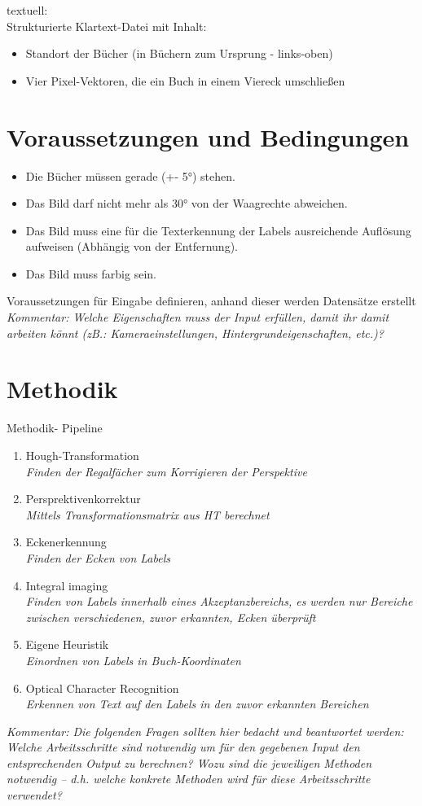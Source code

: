 \documentclass[deutsch]{scrartcl}
\begin{document}
\noindent textuell:\\
Strukturierte Klartext-Datei mit Inhalt:
\begin{itemize}
  \item Standort der Bücher (in Büchern zum Ursprung - links-oben)
  \item Vier Pixel-Vektoren, die ein Buch in einem Viereck umschließen
\end{itemize}

\section{Voraussetzungen und Bedingungen}

\begin{itemize}
  \item Die Bücher müssen gerade (+- 5°) stehen.
  \item Das Bild darf nicht mehr als 30° von der Waagrechte abweichen.
  \item Das Bild muss eine für die Texterkennung der Labels ausreichende Auflösung aufweisen (Abhängig von der Entfernung).
  \item Das Bild muss farbig sein.
\end{itemize}

Voraussetzungen für Eingabe definieren, anhand dieser werden Datensätze erstellt\\
\textit{Kommentar: Welche Eigenschaften muss der Input erfüllen, damit ihr damit arbeiten könnt (zB.: Kameraeinstellungen, Hintergrundeigenschaften, etc.)?}
\section{Methodik}
Methodik- Pipeline
\begin{enumerate}
	\item Hough-Transformation\\
		\textit{Finden der Regalfächer zum Korrigieren der Perspektive}
	\item Persprektivenkorrektur\\
		\textit{Mittels Transformationsmatrix aus HT berechnet}
	\item Eckenerkennung\\
		\textit{Finden der Ecken von Labels}
	\item Integral imaging\\
		\textit{Finden von Labels innerhalb eines Akzeptanzbereichs, es werden nur Bereiche zwischen verschiedenen, zuvor erkannten, Ecken überprüft}
	\item Eigene Heuristik\\
		\textit{Einordnen von Labels in Buch-Koordinaten}
	\item Optical Character Recognition\\
		\textit{Erkennen von Text auf den Labels in den zuvor erkannten Bereichen}
\end{enumerate}
\textit{Kommentar: Die folgenden Fragen sollten hier bedacht und beantwortet werden: Welche Arbeitsschritte sind notwendig um für den gegebenen Input den entsprechenden Output zu berechnen? Wozu sind die jeweiligen Methoden notwendig – d.h. welche konkrete Methoden wird für diese Arbeitsschritte verwendet?}
\end{document}
